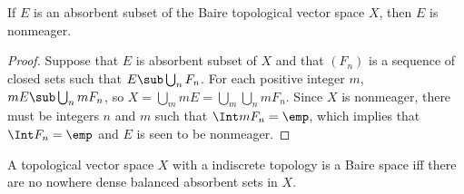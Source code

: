 \begin{proposition}\label{TVS Baire absorbent is nonmeager}
If $E$ is an absorbent subset of the Baire topological vector space $X$, then $E$ is nonmeager.
\end{proposition}
\begin{proof}
Suppose that $E$ is absorbent subset of $X$ and that $(F_n)$ is a sequence of closed sets such that $E\sub\bigcup_nF_n$. For each positive integer $m$, $mE\sub\bigcup_{n}mF_n$, so $X=\bigcup_mmE=\bigcup_m\bigcup_nmF_n$. Since $X$ is nonmeager, there must be integers $n$ and $m$ such that $\Int mF_n=\emp$, which implies that $\Int F_n=\emp$ and $E$ is seen to be nonmeager.
\end{proof}
\begin{proposition}\label{TVS Baire iff no nowhere dense balanced absorbent}
A topological vector space $X$ with a indiscrete topology is a Baire space iff there are no nowhere dense balanced absorbent sets in $X$.
\end{proposition}
